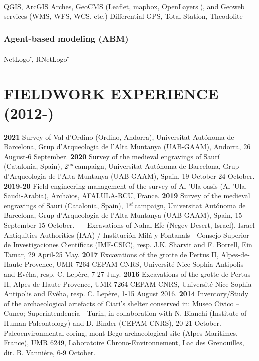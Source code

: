 \documentclass{article}
\begin{document}
QGIS, ArcGIS {\textbar} Arches, GeoCMS (\textsf{Leaflet}, \textsf{mapbox}, \textsf{OpenLayers\textsuperscript{-}}), and Geoweb services (WMS, WFS, WCS, etc.) {\textbar} Differential GPS, Total Station, Theodolite

\subsubsection*{Agent-based modeling (ABM)}

NetLogo\textsuperscript{-}, \textsf{RNetLogo\textsuperscript{-}}


\section{FIELDWORK EXPERIENCE (2012-)}

\textbf{2021 }Survey of Val d'Ordino (Ordino, Andorra), Universitat Aut\'{o}noma de Barcelona, Grup d'Arqueologia de l'Alta Muntanya (UAB-GAAM), Andorra, 26 August-6 September.
\smallbreak
\textbf{2020 }Survey of the medieval engravings of Saur\'i (Catalonia, Spain), 2${}^{nd\ }$campaign, Universitat Aut\'{o}noma de Barcelona, Grup d'Arqueologia de l'Alta Muntanya (UAB-GAAM), Spain, 19 October-24 October.
\smallbreak
\textbf{2019-20 }Field engineering management of the survey of Al-'Ula oasis (Al-'Ula, Saudi-Arabia), Archa\"{i}os, AFALULA-RCU, France.
\smallbreak
\textbf{2019 }Survey of the medieval engravings of Sauri (Catalonia, Spain), 1${}^{st\ }$campaign, Universitat Aut\'{o}noma de Barcelona, Grup d'Arqueologia de l'Alta Muntanya (UAB-GAAM), Spain, 15 September-15 October.
\smallbreak
\textbf{--- }Excavations of Nahal Efe (Negev Desert, Israel), Israel Antiquities Authorities (IAA) / Instituci\'{o}n Mil\'{a} y Fontanals - Consejo Superior de Investigaciones Cient\'{i}ficas (IMF-CSIC), resp. J.K. Sharvit and F. Borrell, Ein Tamar, 29 April-25 May.
\smallbreak
\textbf{2017 }Excavations of the grotte de Pertus II, Alpes-de-Haute-Provence, UMR 7264 CEPAM-CNRS, Universit\'{e} Nice Sophia-Antipolis and Ev\'{e}ha, resp. C. Lep\`{e}re, 7-27 July.
\smallbreak
\textbf{2016 }Excavations of the grotte de Pertus II, Alpes-de-Haute-Provence, UMR 7264 CEPAM-CNRS, Universit\'{e} Nice Sophia-Antipolis and Ev\'{e}ha, resp. C. Lep\`{e}re, 1-15 August 2016.
\smallbreak
\textbf{2014 }Inventory/Study of the archaeological artefacts of Ciari's shelter conserved in: Museo Civico -- Cuneo; Superintendencia - Turin, in collaboration with N. Bianchi (Institute of Human Paleontology) and D. Binder (CEPAM-CNRS), 20-21 October.
\smallbreak
\textbf{--- }Paleoenvironmental coring, mont Bego archaeological site (Alpes-Maritimes, France), UMR 6249, Laboratoire Chrono-Environnement, Lac des Grenouilles, dir. B. Vanni\'{e}re, 6-9 October.
\end{document}
